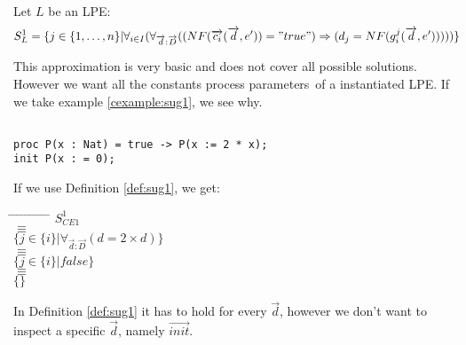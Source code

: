 \documentclass[a4paper,10pt]{article}
\newcommand{\lpe}{linear process equation}
\newcommand{\ovr}{\overrightarrow}
\newcommand{\pp}{process parameter}
\newcommand{\pps}{process parameters}
\begin{document}
\begin{defn} \label{def:sug1} Let $L$ be an LPE:
\begin{displaymath}
S_L^1 =
\lbrace   
j \in \lbrace 1, \ldots , n \rbrace \vert \forall_{i\in I} (\forall_{\ovr{d}: \ovr{D}}((NF(\ovr{c_i}(\ovr{d},e')) = "true")  \Rightarrow (d_j = NF(g_i^j(\ovr{d},e')))))\rbrace
\end{displaymath}

 
This approximation is very basic and does not cover all possible solutions. However we want all
the constants \pps\ of a instantiated LPE. If we take example
\ref{cexample:sug1}, we see why.
\begin{example}[Let $CE1$ be] \label{cexample:sug1}\begin{verbatim}

proc P(x : Nat) = true -> P(x := 2 * x);
init P(x : = 0);

\end{verbatim}
\end{example}

If we use Definition \ref{def:sug1}, we get:\\
\begin{tabbing}
\hspace*{5.mm} \= \hspace*{5.mm} \= \hspace*{5.mm} \= \hspace*{5.mm} \= \hspace*{5.mm} \= \hspace*{5.mm}  \= \hspace*{5.mm}  \= \hspace*{5.mm}  \= \hspace*{5.mm} \= \hspace*{5.mm} \= \hspace*{5.mm}\kill
\> \> $S_{CE1}^1$\\
\> $\equiv$\\
\> \> $\lbrace j \in \lbrace i \rbrace \vert \forall_{\ovr{d}:\ovr{D}}(d = 2 \times d ) \rbrace $\\
\> $\equiv$ \\
\> \> $\lbrace j \in \lbrace i \rbrace \vert false \rbrace $\\
\> $\equiv$ \\
\> \> $\lbrace  \rbrace$\\
\end{tabbing}
In Definition \ref{def:sug1} it has to hold for every $\ovr{d}$, however
we don't want to inspect a specific $\ovr{d}$, namely $\ovr{init}$.
\end{defn}
\end{document}
